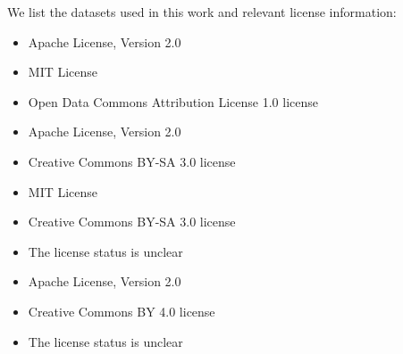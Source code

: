 \documentclass[10pt]{article}
\begin{document}
\newpage 
We list the datasets used in this work and relevant license information:
\begin{itemize}
\item {}   Apache License, Version 2.0
\item {}    MIT License
\item {}  Open Data Commons Attribution License 1.0 license
\item {}  Apache License, Version 2.0
\item {}       Creative Commons BY-SA 3.0 license   
\item {}       MIT License
\item {}           Creative Commons BY-SA 3.0 license
\item {}       The license status is unclear  
\item {}          Apache License, Version 2.0
\item {}        Creative Commons BY 4.0 license
\item {}     The license status is unclear
\end{itemize}
\end{document}
